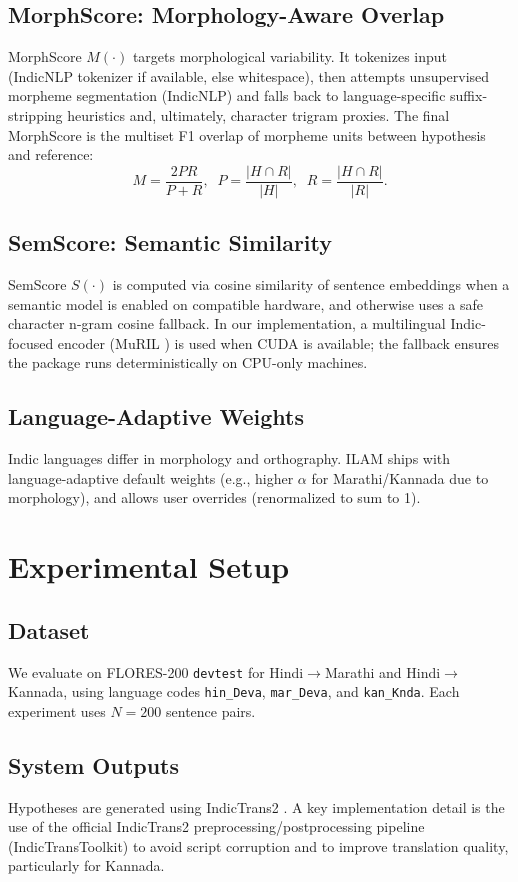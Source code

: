 \documentclass[conference]{IEEEtran}
\begin{document}
\subsection{MorphScore: Morphology-Aware Overlap}
MorphScore $M(\cdot)$ targets morphological variability. It tokenizes input (IndicNLP tokenizer if available, else whitespace), then attempts unsupervised morpheme segmentation (IndicNLP) and falls back to language-specific suffix-stripping heuristics and, ultimately, character trigram proxies. The final MorphScore is the multiset F1 overlap of morpheme units between hypothesis and reference:
\begin{equation}
M = \frac{2PR}{P+R},\;\; P=\frac{|H\cap R|}{|H|},\;\; R=\frac{|H\cap R|}{|R|}.
\end{equation}

\subsection{SemScore: Semantic Similarity}
SemScore $S(\cdot)$ is computed via cosine similarity of sentence embeddings when a semantic model is enabled on compatible hardware, and otherwise uses a safe character n-gram cosine fallback. In our implementation, a multilingual Indic-focused encoder (MuRIL \cite{murril}) is used when CUDA is available; the fallback ensures the package runs deterministically on CPU-only machines.

\subsection{Language-Adaptive Weights}
Indic languages differ in morphology and orthography. ILAM ships with language-adaptive default weights (e.g., higher $\alpha$ for Marathi/Kannada due to morphology), and allows user overrides (renormalized to sum to 1).

\section{Experimental Setup}
\subsection{Dataset}
We evaluate on FLORES-200 \texttt{devtest} \cite{flores200} for Hindi$\rightarrow$Marathi and Hindi$\rightarrow$Kannada, using language codes \texttt{hin\_Deva}, \texttt{mar\_Deva}, and \texttt{kan\_Knda}. Each experiment uses $N=200$ sentence pairs.

\subsection{System Outputs}
Hypotheses are generated using IndicTrans2 \cite{indictrans2}. A key implementation detail is the use of the official IndicTrans2 preprocessing/postprocessing pipeline (IndicTransToolkit) to avoid script corruption and to improve translation quality, particularly for Kannada.
\end{document}
